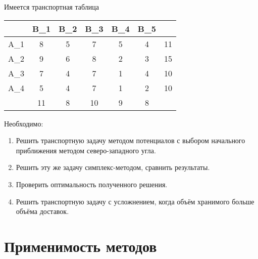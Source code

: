 \documentclass{article}
\begin{document}
\noindent Имеется транспортная таблица
\begin{table}[H]
    \centering
    \begin{tabular}{|c|c|c|c|c|c| |c|}
    \hline
        &\cellcolor{myGren} B_1 & \cellcolor{myGren}B_2 & \cellcolor{myGren}B_3 & \cellcolor{myGren}B_4 & \cellcolor{myGren} B_5 &  \\ \hline
       \cellcolor{myGren} A_1 & 8 & 5 & 7 & 5 & 4 & 11\\ \hline
       \cellcolor{myGren} A_2 & 9 & 6 & 8 & 2 & 3 & 15\\  \hline
       \cellcolor{myGren} A_3 & 7 & 4 & 7 & 1 & 4 & 10\\ \hline
       \cellcolor{myGren} A_4 & 5 & 4 & 7 & 1 & 2 & 10\\ \hline \hline
            & 11 & 8 & 10 & 9 & 8 & \\
            \hline
    \end{tabular}
    \label{tab:Tabel1}
\end{table}

\noindent Необходимо:
\begin{enumerate}
    \item Решить транспортную задачу методом потенциалов с выбором начального приближения методом северо-западного угла.
    \item Решить эту же задачу симплекс-методом, сравнить результаты.
    \item Проверить оптимальность полученного решения.
    \item Решить транспортную задачу с усложнением, когда объём хранимого больше объёма доставок.
\end{enumerate}

\section{Применимость методов}
\end{document}
